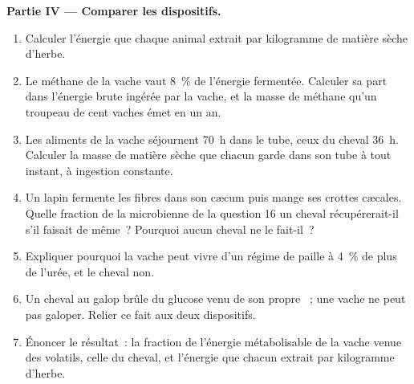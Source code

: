 \begin{problem}
\medskip
\noindent\textbf{Partie IV --- Comparer les dispositifs.}
\begin{enumerate}[resume]
  \item Calculer l'énergie que chaque animal extrait par kilogramme de
        matière sèche d'herbe.
  \item Le méthane de la vache vaut \qty{8}{\%} de l'énergie fermentée.
        Calculer sa part dans l'énergie brute ingérée par la vache, et
        la masse de méthane qu'un troupeau de cent vaches émet en un an.
  \item Les aliments de la vache séjournent \qty{70}{h} dans le tube,
        ceux du cheval \qty{36}{h}. Calculer la masse de matière sèche
        que chacun garde dans son tube à tout instant, à ingestion
        constante.
  \item Un lapin fermente les fibres dans son cæcum puis mange ses
        crottes cæcales. Quelle fraction de la  microbienne de
        la question 16 un cheval récupérerait-il s'il faisait de même~?
        Pourquoi aucun cheval ne le fait-il~?
  \item Expliquer pourquoi la vache peut vivre d'un régime de paille à
        \qty{4}{\%} de  plus de l'urée, et le cheval non.
  \item Un cheval au galop brûle du glucose venu de son propre
        ~; une vache ne peut pas galoper. Relier ce fait aux
        deux dispositifs.
  \item Énoncer le résultat~: la fraction de l'énergie métabolisable de
        la vache venue des  volatils, celle du cheval, et
        l'énergie que chacun extrait par kilogramme d'herbe.
\end{enumerate}
\end{problem}
